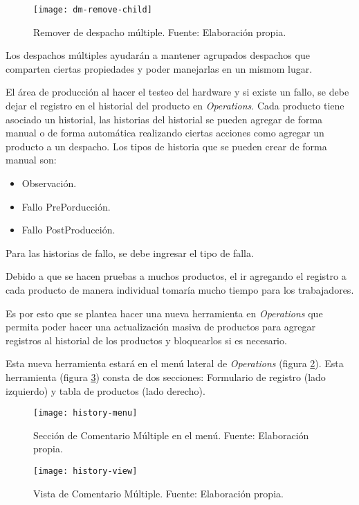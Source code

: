\begin{figure}[H]
	\centering
	\texttt{[image: dm-remove-child]}
	\caption{\label{fig:dm-remove-child} Remover de despacho múltiple. Fuente: Elaboración propia.}
\end{figure}

Los despachos múltiples ayudarán a mantener agrupados despachos que comparten ciertas propiedades y poder manejarlas en un mismom lugar.


El área de producción al hacer el testeo del hardware y si existe un fallo, se debe dejar el registro en el historial del producto en \textit{Operations}.
Cada producto tiene asociado un historial, las historias del historial se pueden agregar de forma manual o de forma automática realizando ciertas acciones como agregar un producto a un despacho.
Los tipos de historia que se pueden crear de forma manual son:
\begin{itemize}
    \item Observación.
    \item Fallo PrePorducción.
    \item Fallo PostProducción.
\end{itemize}

Para las historias de fallo, se debe ingresar el tipo de falla.

Debido a que se hacen pruebas a muchos productos, el ir agregando el registro a cada producto de manera individual tomaría mucho tiempo para los trabajadores.

Es por esto que se plantea hacer una nueva herramienta en \textit{Operations} que permita poder hacer una actualización masiva de productos para agregar registros al historial de los productos y bloquearlos si es necesario.

Esta nueva herramienta estará en el menú lateral de \textit{Operations} (figura \ref{fig:history-menu}). Esta herramienta (figura \ref{fig:history-view}) consta de dos secciones: Formulario de registro (lado izquierdo) y tabla de productos (lado derecho).

\begin{figure}[H]
	\centering
	\texttt{[image: history-menu]}
	\caption{\label{fig:history-menu} Sección de Comentario Múltiple en el menú. Fuente: Elaboración propia.}
\end{figure}

\begin{figure}[H]
	\centering
	\texttt{[image: history-view]}
	\caption{\label{fig:history-view} Vista de Comentario Múltiple. Fuente: Elaboración propia.}
\end{figure}

